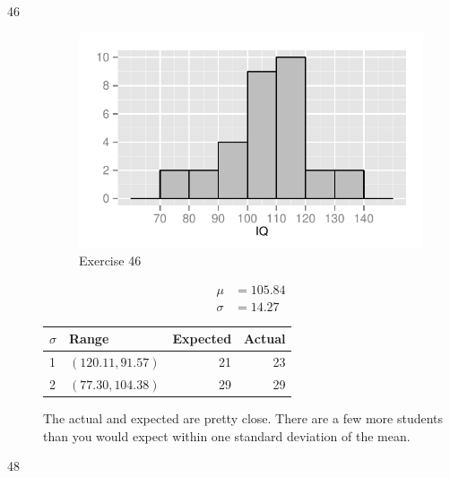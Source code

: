 \documentclass[letterpaper, landscape]{exam}
\begin{document}
\begin{description}
      \item[46]
        \begin{figure}[H]
          \centering
          \includegraphics{figures/ex46.pdf}
          \caption{Exercise 46}
        \end{figure}

        \begin{align*}
          \mu    & = 105.84 \\
          \sigma & = 14.27
        \end{align*}

        \begin{tabular}[H]{llrr}
          \toprule
          $\sigma$ & Range             & Expected & Actual \\
          \midrule
          1         & $(120.11, 91.57)$ & 21       & 23 \\
          2         & $(77.30, 104.38)$ & 29       & 29 \\
          \bottomrule
        \end{tabular}

        The actual and expected are pretty close.  There are a few more students than you
        would expect within one standard deviation of the mean.  

      \pagebreak

      \item[48]
        \begin{parts}
          \part{} 
\end{parts}
\end{description}
\end{document}
